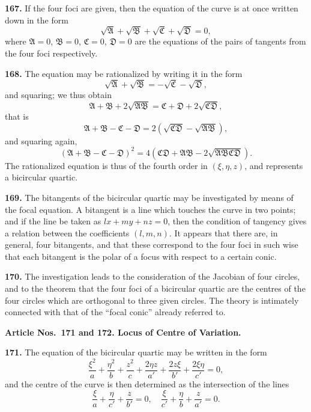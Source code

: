 \documentclass[12pt,a4paper]{article}
\theoremstyle{definition}
\begin{document}
\noindent\textbf{167.} If the four foci are given, then the equation of the curve is at once
written down in the form
\[
\sqrt{\mathfrak{A}} + \sqrt{\mathfrak{B}} + \sqrt{\mathfrak{C}} + \sqrt{\mathfrak{D}} = 0,
\]
where $\mathfrak{A} = 0$, $\mathfrak{B} = 0$, $\mathfrak{C} = 0$, $\mathfrak{D} = 0$ are the equations of the pairs of tangents from the four foci
respectively.

\noindent\textbf{168.} The equation may be rationalized by writing it in the form
\[
\sqrt{\mathfrak{A}} + \sqrt{\mathfrak{B}} = -\sqrt{\mathfrak{C}} - \sqrt{\mathfrak{D}},
\]
and squaring; we thus obtain
\[
\mathfrak{A} + \mathfrak{B} + 2\sqrt{\mathfrak{A}\mathfrak{B}} = \mathfrak{C} + \mathfrak{D} + 2\sqrt{\mathfrak{C}\mathfrak{D}},
\]
that is
\[
\mathfrak{A} + \mathfrak{B} - \mathfrak{C} - \mathfrak{D} = 2(\sqrt{\mathfrak{C}\mathfrak{D}} - \sqrt{\mathfrak{A}\mathfrak{B}}),
\]
and squaring again,
\[
(\mathfrak{A} + \mathfrak{B} - \mathfrak{C} - \mathfrak{D})^2 = 4(\mathfrak{C}\mathfrak{D} + \mathfrak{A}\mathfrak{B} - 2\sqrt{\mathfrak{A}\mathfrak{B}\mathfrak{C}\mathfrak{D}}).
\]
The rationalized equation is thus of the fourth order in $(\xi, \eta, z)$, and represents a
bicircular quartic.

\newpage
\noindent\textbf{169.} The bitangents of the bicircular quartic may be investigated by means
of the focal equation. A bitangent is a line which touches the curve in two points;
and if the line be taken as $lx + my + nz = 0$, then the condition of tangency gives a
relation between the coefficients $(l, m, n)$. It appears that there are, in general, four
bitangents, and that these correspond to the four foci in such wise that each bitangent
is the polar of a focus with respect to a certain conic.

\noindent\textbf{170.} The investigation leads to the consideration of the Jacobian of four circles,
and to the theorem that the four foci of a bicircular quartic are the centres of the
four circles which are orthogonal to three given circles. The theory is intimately
connected with that of the ``focal conic'' already referred to.

\vspace{0.5em}
\noindent\textbf{Article Nos.~171 and 172. Locus of Centre of Variation.}

\vspace{0.3em}
\noindent\textbf{171.} The equation of the bicircular quartic may be written in the form
\[
\frac{\xi^2}{a} + \frac{\eta^2}{b} + \frac{z^2}{c} + \frac{2\eta z}{a'} + \frac{2z\xi}{b'} + \frac{2\xi\eta}{c'} = 0,
\]
and the centre of the curve is then determined as the intersection of the lines
\[
\frac{\xi}{a} + \frac{\eta}{c'} + \frac{z}{b'} = 0, \quad
\frac{\xi}{c'} + \frac{\eta}{b} + \frac{z}{a'} = 0.
\]
\end{document}
